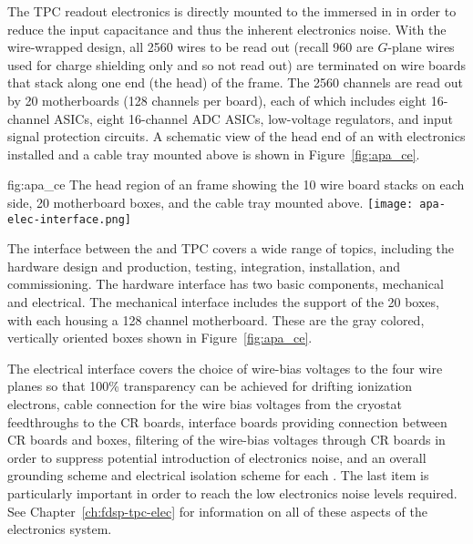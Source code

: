 The TPC readout electronics is directly mounted to the  immersed in \lar in order to reduce the input capacitance and thus the inherent electronics noise.  With the wire-wrapped design, all \num{2560} wires to be read out (recall \num{960} are $G$-plane wires used for charge shielding only and so not read out) are terminated on wire boards that stack along one end (the head) of the  frame.  The \num{2560} channels are read out by \num{20}  motherboards (\num{128} channels per board), each of which includes eight \num{16}-channel  ASICs, eight \num{16}-channel ADC ASICs, low-voltage regulators, and input signal protection circuits.  A schematic view of the head end of an  with electronics installed and a cable tray mounted above is shown in Figure~\ref{fig:apa_ce}. 

\begin{dunefigure}{fig:apa_ce}
{The head region of an  frame showing the 10 wire board stacks on each side, \num{20}  motherboard boxes, and the cable tray mounted above.}
\texttt{[image: apa-elec-interface.png]}
\end{dunefigure}

The interface between the  and TPC  covers a wide range of topics, including the hardware design and production, testing, integration, installation, and commissioning. The hardware interface has two basic components, mechanical and electrical. The mechanical interface includes the support of the \num{20}  boxes, with each housing a \num{128} channel  motherboard.  These are the gray colored, vertically oriented boxes shown in Figure~\ref{fig:apa_ce}. 

The electrical interface covers the choice of wire-bias voltages to the four wire planes so that \num{100}\% transparency can be achieved for drifting ionization electrons, cable connection for the wire bias voltages from the cryostat feedthroughs to the CR boards, interface boards providing connection between CR boards and  boxes, filtering of the wire-bias voltages through CR boards in order to suppress potential introduction of electronics noise, and an overall grounding scheme and electrical isolation scheme for each . The last item is particularly important in order to reach the low electronics noise levels required.  See Chapter~\ref{ch:fdsp-tpc-elec} for information on all of these aspects of the  electronics system.


